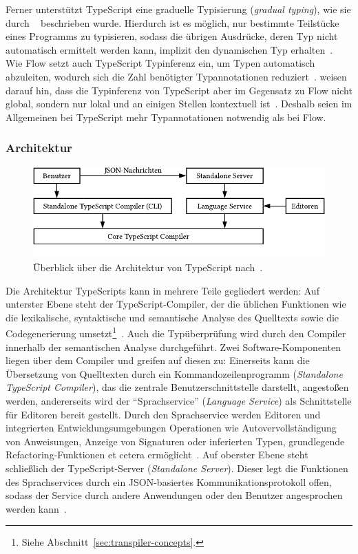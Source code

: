 Ferner unterstützt TypeScript eine graduelle Typisierung (\textit{gradual typing}), wie sie durch \citeauthor{SIEK:2007}~\autocite{SIEK:2007} beschrieben wurde. Hierdurch ist es möglich, nur bestimmte Teilstücke eines Programms zu typisieren, sodass die übrigen Ausdrücke, deren Typ nicht automatisch ermittelt werden kann, implizit den dynamischen Typ  erhalten~\autocite{TYPESCRIPT:DESIGN_GOALS}.
Wie Flow setzt auch TypeScript Typinferenz ein, um Typen automatisch abzuleiten, wodurch sich die Zahl benötigter Typannotationen reduziert~\autocite[4]{BIERMAN:2014}. \citeauthor{FLOW:PAPER} weisen darauf hin, dass die Typinferenz von TypeScript aber im Gegensatz zu Flow nicht global, sondern nur lokal und an einigen Stellen kontextuell ist~\autocite[24]{FLOW:PAPER}. Deshalb seien im Allgemeinen bei TypeScript mehr Typannotationen notwendig als bei Flow.

\subsubsection{Architektur}

\bigbreak
\begin{figure}[htb]
  \includegraphics[width=.75\textwidth]{src/2_Grundlagen/fig/ts-architecture.pdf}
  \caption{Überblick über die Architektur von TypeScript nach~\autocite{TYPESCRIPT:ARCHITECTURE}.}
	\label{fig:ts-architecture}
\end{figure}

Die Architektur TypeScripts kann in mehrere Teile gegliedert werden: Auf unterster Ebene steht der TypeScript-Compiler, der die üblichen Funktionen wie die lexikalische, syntaktische und semantische Analyse des Quelltexts sowie die Codegenerierung umsetzt\footnote{Siehe Abschnitt~\ref{sec:transpiler-concepts}.}~\autocite{TYPESCRIPT:ARCHITECTURE}. Auch die Typüberprüfung wird durch den Compiler innerhalb der semantischen Analyse durchgeführt. Zwei Software-Komponenten liegen über dem Compiler und greifen auf diesen zu: Einerseits kann die Übersetzung von Quelltexten durch ein Kommandozeilenprogramm (\textit{Standalone TypeScript Compiler}), das die zentrale Benutzerschnittstelle darstellt, angestoßen werden, andererseits wird der \enquote{Sprachservice} (\textit{Language Service}) als Schnittstelle für Editoren bereit gestellt. Durch den Sprachservice werden Editoren und integrierten Entwicklungsumgebungen Operationen wie Autovervollständigung von Anweisungen, Anzeige von Signaturen oder inferierten Typen, grundlegende Refactoring-Funktionen et cetera ermöglicht~\autocite{TYPESCRIPT:ARCHITECTURE}. Auf oberster Ebene steht schließlich der TypeScript-Server (\textit{Standalone Server}). Dieser legt die Funktionen des Sprachservices durch ein JSON-basiertes Kommunikationsprotokoll offen, sodass der Service durch andere Anwendungen oder den Benutzer angesprochen werden kann~\autocite{TYPESCRIPT:TSSERVER}.

